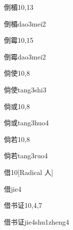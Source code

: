 \begin{entry}{倒楣}{10,13}
  \begin{phonetics}{倒楣}{dao3mei2}
  \end{phonetics}
\end{entry}

\begin{entry}{倒霉}{10,15}
  \begin{phonetics}{倒霉}{dao3mei2}
  \end{phonetics}
\end{entry}

\begin{entry}{倘使}{10,8}
  \begin{phonetics}{倘使}{tang3shi3}
  \end{phonetics}
\end{entry}

\begin{entry}{倘或}{10,8}
  \begin{phonetics}{倘或}{tang3huo4}
  \end{phonetics}
\end{entry}

\begin{entry}{倘若}{10,8}
  \begin{phonetics}{倘若}{tang3ruo4}
  \end{phonetics}
\end{entry}

\begin{entry}{借}{10}[Radical 人]
  \begin{phonetics}{借}{jie4}
  \end{phonetics}
\end{entry}

\begin{entry}{借书证}{10,4,7}
  \begin{phonetics}{借书证}{jie4shu1zheng4}
  \end{phonetics}
\end{entry}

